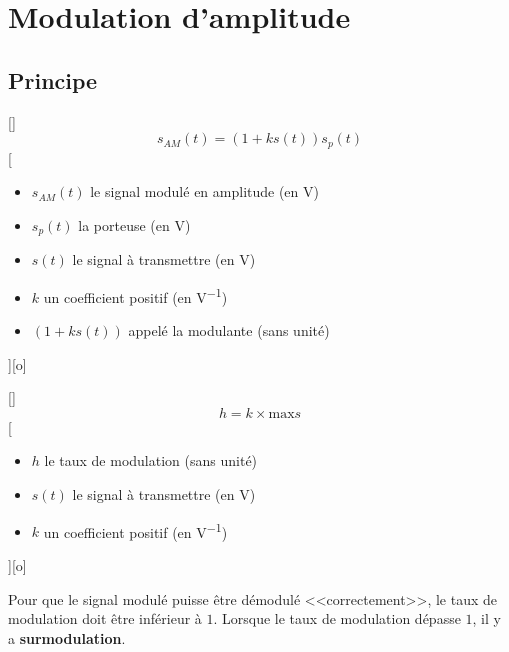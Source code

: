 \section{Modulation d'amplitude}
\subsection{Principe}

[]
{$$s_{AM}(t)=\left(1+ks(t)\right)s_p(t)$$}
[
  \begin{itemize}
    \item $s_{AM}(t)$ le signal modulé en amplitude (en \unit{V})
    \item $s_{p}(t)$ la porteuse (en \unit{V})
    \item $s(t)$ le signal à transmettre (en \unit{V})
    \item $k$ un coefficient positif (en \unit{V^{-1}})
    \item $\left(1+ks(t)\right)$ appelé la modulante (sans unité)
  \end{itemize}
][o]



[]
{$$h=k\times \text{max}s$$}
[
  \begin{itemize}
    \item $h$ le taux de modulation (sans unité)
    \item $s(t)$ le signal à transmettre (en \unit{V})
    \item $k$ un coefficient positif (en \unit{V^{-1}})
  \end{itemize}
][o]


Pour que le signal modulé puisse être démodulé <<correctement>>, le taux de modulation doit être inférieur à $1$. Lorsque le taux de modulation dépasse $1$, il y a \textbf{surmodulation}.

